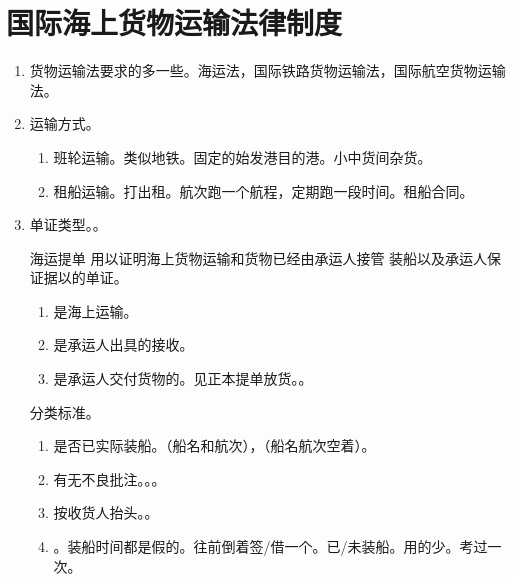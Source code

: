 \section{国际海上货物运输法律制度}
\begin{enumerate}
  \item 货物运输法要求的多一些。海运法，国际铁路货物运输法，国际航空货物运输法。
  \item 运输方式。
        \begin{enumerate}
          \item 班轮运输。类似地铁。固定的始发港目的港。小中货间杂货。
          \item 租船运输。打出租。航次跑一个航程，定期跑一段时间。租船合同。
        \end{enumerate}
  \item 单证类型。。
        \begin{kk}{海运提单}
          用以证明海上货物运输和货物已经由承运人接管 \hz 装船以及承运人保证据以的单证。
          \begin{enumerate}
            \item 是海上运输。
            \item 是承运人出具的接收。
            \item 是承运人交付货物的。见正本提单放货。。
          \end{enumerate}
          \tcblower
          分类标准。
          \begin{enumerate}
            \item 是否已实际装船。（船名和航次），（船名航次空着）。
            \item 有无不良批注。。。
            \item 按收货人抬头。。
            \item {}。装船时间都是假的。往前倒着签/借一个。已/未装船。用的少。考过一次。
          \end{enumerate}
        \end{kk}


\end{enumerate}
